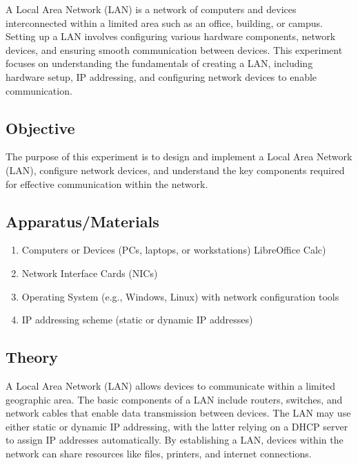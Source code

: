 \documentclass[a4paper,9pt]{article}
\begin{document}
A Local Area Network (LAN) is a network of computers and devices interconnected within a limited area such as an office, building, or campus. Setting up a LAN involves configuring various hardware components, network devices, and ensuring smooth communication between devices. This experiment focuses on understanding the fundamentals of creating a LAN, including hardware setup, IP addressing, and configuring network devices to enable communication.

\subsection{Objective}
The purpose of this experiment is to design and implement a Local Area Network (LAN), configure network devices, and understand the key components required for effective communication within the network.

\subsection{Apparatus/Materials}
\begin{enumerate}
	\item Computers or Devices (PCs, laptops, or workstations) LibreOffice Calc)
	\item Network Interface Cards (NICs)
	\item Operating System (e.g., Windows, Linux) with network configuration tools
	\item IP addressing scheme (static or dynamic IP addresses)
	
\end{enumerate}
\subsection{Theory}
A Local Area Network (LAN) allows devices to communicate within a limited geographic area. The basic components of a LAN include routers, switches, and network cables that enable data transmission between devices. The LAN may use either static or dynamic IP addressing, with the latter relying on a DHCP server to assign IP addresses automatically. By establishing a LAN, devices within the network can share resources like files, printers, and internet connections.
\end{document}
